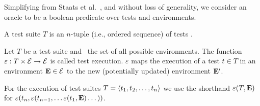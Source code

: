 

Simplifying from Staats
et al.~\cite{staatsetal:ICSE:2011}, and without loss of generality,
we consider an oracle to be a boolean predicate over tests and environments.


\begin{definition}
A test suite\/ $T$ is an $n$-tuple (i.e., ordered sequence) of tests
.

\end{definition}

\begin{definition}
Let\/ $T$ be a test suite and\/ \environs\ the set of all possible
environments.
The function\/ $\varepsilon: T \times \mathcal{E} \rightarrow
\mathcal{E}$ is called test
execution. $\varepsilon$ maps the execution of a test\/ $ t \in T$ 
in an environment\/ $\mathbf{E} \in \mathcal{E}$ to the new (potentially updated)
environment\/ $\mathbf{E}'$.

For the execution of test suites\/ $T =  \langle t_1, t_2, \dots, t_n \rangle $
we use the shorthand\/
$\varepsilon(T,\mathbf{E})$ for $\varepsilon(t_n,\varepsilon(t_{n-1},\dots \varepsilon(t_1,\mathbf{E}) \dots ))$.
\end{definition}

